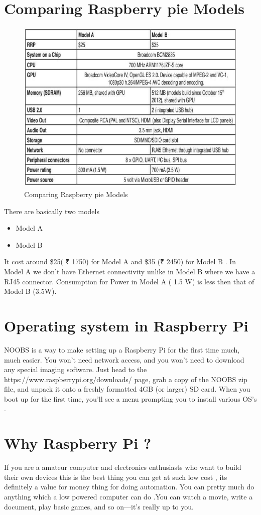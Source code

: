 \section{Comparing Raspberry pie Models}
\begin{figure}[ht]
\centering
\includegraphics[scale=0.3]{images/rasp7.png}
\caption{Comparing Raspberry pie Models}
\end{figure}
There are basically two models
\begin{itemize}
\item Model A
\item Model B
\end{itemize}
It cost around \$25( ₹ 1750) for Model A and \$35 (₹ 2450) for Model B .
In Model A we don’t have Ethernet connectivity unlike in Model B where we have a RJ45 connector.
Consumption for Power in Model A ( 1.5 W) is less then that of Model B (3.5W).
\section{Operating system in Raspberry Pi}
NOOBS is a way to make setting up a Raspberry Pi for the first time much, much easier. You won’t need network access, and you won’t need to download any special imaging software. Just head to the https://www.raspberrypi.org/downloads/   page, grab a copy of the NOOBS zip file, and unpack it onto a freshly formatted 4GB (or larger) SD card. When you boot up for the first time, you’ll see a menu prompting you to install various OS’s .
\section{Why Raspberry Pi ?}
If you are a amateur computer and electronics enthusiasts who want to build their own devices this is the best thing you can get at such low cost , its definitely a value for money thing for doing automation.
You can pretty much do anything which a low powered computer can do .You can watch a movie, write a document, play basic games, and so on—it’s really up to you.
